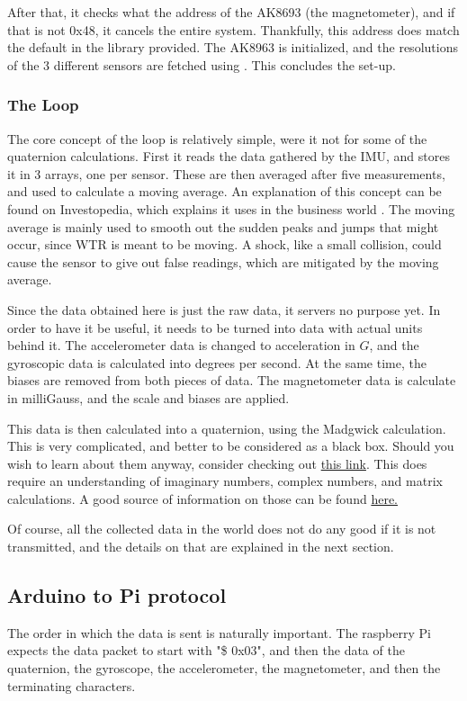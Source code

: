 After that, it checks what the address of the AK8693 (the magnetometer), and if that is not 0x48, it cancels the entire system.
Thankfully, this address does match the default in the library provided.
The AK8963 is initialized, and the resolutions of the 3 different sensors are fetched using .
This concludes the set-up.


\subsubsection{The Loop}
The core concept of the loop is relatively simple, were it not for some of the quaternion calculations.
First it reads the data gathered by the IMU, and stores it in 3 arrays, one per sensor.
These are then averaged after five measurements, and used to calculate a moving average.
An explanation of this concept can be found on Investopedia, which explains it uses in the business world \cite{movingavg}.
The moving average is mainly used to smooth out the sudden peaks and jumps that might occur, since WTR is meant to be moving.
A shock, like a small collision, could cause the sensor to give out false readings, which are mitigated by the moving average.

Since the data obtained here is just the raw data, it servers no purpose yet.
In order to have it be useful, it needs to be turned into data with actual units behind it.
The accelerometer data is changed to acceleration in $G$, and the gyroscopic data is calculated into degrees per second.
At the same time, the biases are removed from both pieces of data.
The magnetometer data is calculate in milliGauss, and the scale and biases are applied.

This data is then calculated into a quaternion, using the Madgwick calculation.
This is very complicated, and better to be considered as a black box.
Should you wish to learn about them anyway, consider checking out \href{http://www.ijcee.org/vol10/974-T4004.pdf}{this link}.
This does require an understanding of imaginary numbers, complex numbers, and matrix calculations.
A good source of information on those can be found \href{https://www.3dgep.com/understanding-quaternions/#The_Complex_Plane}{here.}

Of course, all the collected data in the world does not do any good if it is not transmitted, and the details on that are explained in the next section.

\subsection{Arduino to Pi protocol}
The order in which the data is sent is naturally important.
The raspberry Pi expects the data packet to start with "\$ 0x03", and then the data of the quaternion, the gyroscope, the accelerometer, the magnetometer, and then the terminating characters. 

